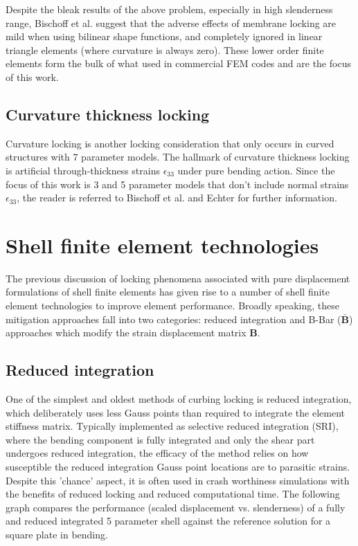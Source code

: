 Despite the bleak results of the above problem, especially in high slenderness range, Bischoff et al. \cite{BischLitBook04} suggest that the adverse effects of membrane locking are mild when using bilinear shape functions, and completely ignored in linear triangle elements (where curvature is always zero). These lower order finite elements form the bulk of what used in commercial FEM codes and are the focus of this work.

\subsection{Curvature thickness locking}

Curvature locking is another locking consideration that only occurs in curved structures with 7 parameter models. The hallmark of curvature thickness locking is artificial through-thickness strains $\epsilon_{33}$ under pure bending action. Since the focus of this work is 3 and 5 parameter models that don't include normal strains $\epsilon_{33}$, the reader is referred to Bischoff et al. \cite{BischLitBook04} and Echter \cite{Echter13} for further information.

\section{Shell finite element technologies}
\label{FE_tech}

The previous discussion of locking phenomena associated with pure displacement formulations of shell finite elements has given rise to a number of shell finite element technologies to improve element performance. Broadly speaking, these mitigation approaches fall into two categories: reduced integration and B-Bar ($\bar{\mathbf{B}}$) approaches which modify the strain displacement matrix $\mathbf{B}$. 

\subsection{Reduced integration}

One of the simplest and oldest methods of curbing locking is reduced integration, which deliberately uses less Gauss points than required to integrate the element stiffness matrix. Typically implemented as selective reduced integration (SRI), where the bending component is fully integrated and only the shear part undergoes reduced integration, the efficacy of the method relies on how susceptible the reduced integration Gauss point locations are to parasitic strains. Despite this 'chance' aspect, it is often used in crash worthiness simulations with the benefits of reduced locking and reduced computational time. The following graph compares the performance (scaled displacement vs. slenderness) of a fully and reduced integrated 5 parameter shell against the reference solution for a square plate in bending.

